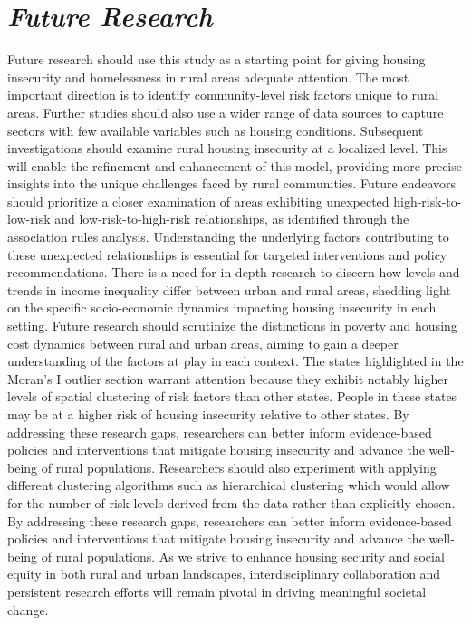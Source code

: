 \section{\textit{Future Research}}

Future research should use this study as a starting point for giving housing insecurity and homelessness in rural areas adequate attention. The most important direction is to identify community-level risk factors unique to rural areas. Further studies should also use a wider range of data sources to capture sectors with few available variables such as housing conditions. Subsequent investigations should examine rural housing insecurity at a localized level. This will enable the refinement and enhancement of this model, providing more precise insights into the unique challenges faced by rural communities.	Future endeavors should prioritize a closer examination of areas exhibiting unexpected high-risk-to-low-risk and low-risk-to-high-risk relationships, as identified through the association rules analysis. Understanding the underlying factors contributing to these unexpected relationships is essential for targeted interventions and policy recommendations. There is a need for in-depth research to discern how levels and trends in income inequality differ between urban and rural areas, shedding light on the specific socio-economic dynamics impacting housing insecurity in each setting. Future research should scrutinize the distinctions in poverty and housing cost dynamics between rural and urban areas, aiming to gain a deeper understanding of the factors at play in each context. The states highlighted in the Moran's I outlier section warrant attention because they exhibit notably higher levels of spatial clustering of risk factors than other states. People in these states may be at a higher risk of housing insecurity relative to other states. By addressing these research gaps, researchers can better inform evidence-based policies and interventions that mitigate housing insecurity and advance the well-being of rural populations. Researchers should also experiment with applying different clustering algorithms such as hierarchical clustering which would allow for the number of risk levels derived from the data rather than explicitly chosen. By addressing these research gaps, researchers can better inform evidence-based policies and interventions that mitigate housing insecurity and advance the well-being of rural populations. As we strive to enhance housing security and social equity in both rural and urban landscapes, interdisciplinary collaboration and persistent research efforts will remain pivotal in driving meaningful societal change. 

\endinput